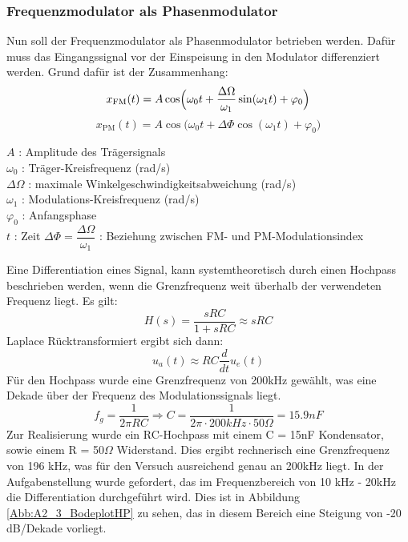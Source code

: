 \documentclass[12pt]{scrartcl}
\begin{document}
\subsubsection{Frequenzmodulator als Phasenmodulator}
\label{kap:2.3}
Nun soll der Frequenzmodulator als Phasenmodulator betrieben werden. Dafür muss das Eingangssignal vor der Einspeisung in den Modulator differenziert werden. 
Grund dafür ist der Zusammenhang: 
\begin{equation}
    x_{\mathrm{FM}}(t) = A\cos\Bigl(\omega_0 t + \frac{\Delta\Omega}{\omega_1}\sin(\omega_1 t) + \varphi_0\Bigr)
\end{equation}
\begin{equation}
    x_{\mathrm{PM}}(t) = A\cos\bigl(\omega_0 t + \Delta\Phi\cos(\omega_1 t) + \varphi_0\bigr)
\end{equation}
\begin{center}
    $A$ : Amplitude des Trägersignals\\
    $\omega_0$ : Träger-Kreisfrequenz (rad/s)\\
    $\Delta\Omega$ : maximale Winkelgeschwindigkeitsabweichung (rad/s)\\
    $\omega_1$ : Modulations-Kreisfrequenz (rad/s)\\
    $\varphi_0$ : Anfangsphase\\
    $t$ : Zeit
    $\Delta\Phi = \dfrac{\Delta\Omega}{\omega_1}$ : Beziehung zwischen FM- und PM-Modulationsindex\\
\end{center}
Eine Differentiation eines Signal, kann systemtheoretisch durch einen Hochpass beschrieben werden, wenn die Grenzfrequenz weit überhalb der verwendeten Frequenz liegt. Es gilt:
\begin{equation}
    H(s) = \frac{sRC}{1+sRC} \approx sRC
\end{equation}
Laplace Rücktransformiert ergibt sich dann: 
\begin{equation}
    u_a(t) \approx RC \frac{d}{dt} u_e(t)
\end{equation}
Für den Hochpass wurde eine Grenzfrequenz von 200kHz gewählt, was eine Dekade über der Frequenz des Modulationssignals liegt. 
\begin{equation}
    f_g = \frac{1}{2\pi RC} \Rightarrow C = \frac{1}{2\pi \cdot 200kHz \cdot 50\Omega} = 15.9 nF \label{eq:fg}
\end{equation}
Zur Realisierung wurde ein RC-Hochpass mit einem C = 15nF Kondensator, sowie einem R = 50$\Omega$ Widerstand. Dies ergibt rechnerisch eine Grenzfrequenz von 196 kHz, was für den Versuch ausreichend genau an 200kHz liegt. In der Aufgabenstellung wurde gefordert, das im Frequenzbereich von 10 kHz - 20kHz die Differentiation durchgeführt wird. Dies ist in Abbildung \ref{Abb:A2_3_BodeplotHP} zu sehen, das in diesem Bereich eine Steigung von -20 dB/Dekade vorliegt. 
\end{document}
